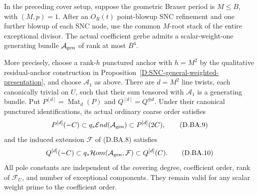 \begin{corollary}
\label{D:bounded-period-generating-root-anchor}
In the preceding cover setup, suppose the geometric Brauer
period is $M\le B$, with $(M,p)=1$. After an $O_R(t)$
point-blowup SNC refinement and one further blowup of each
SNC node, use the common $M$-root stack of the entire
exceptional divisor. The actual coefficient gerbe admits
a scalar-weight-one generating bundle $\mathcal A_{\rm gen}$
of rank at most $B^4$.

More precisely, choose a rank-$h$ punctured anchor with
$h=M^2$ by the qualitative residual-anchor construction
in Proposition~\ref{D:SNC-general-weighted-presentation},
and choose $\mathcal A_1$ as above. There are $d=M^2$
line twists, each canonically trivial on $U$, such that
their sum tensored with $\mathcal A_1$ is a generating
bundle. Put $P^{[d]}=\operatorname{Mat}_d(P)$ and
$Q^{[d]}=Q^{\oplus d}$. Under their canonical punctured
identifications, its actual ordinary coarse order satisfies
\[
 P^{[d]}(-C)\subset
 q_*\mathcal End(\mathcal A_{\rm gen})
                  \subset P^{[d]}(2C),                \tag{D.BA.9}
\]
and the induced extension $\mathcal F$ of (D.BA.8) satisfies
\[
 Q^{[d]}(-C)\subset
 q_*\mathcal Hom(\mathcal A_{\rm gen},\mathcal F)
                  \subset Q^{[d]}(C).                 \tag{D.BA.10}
\]
All pole constants are independent of the covering degree,
coefficient order, rank of $\mathcal F_U$, and number of
exceptional components. They remain valid for any scalar
weight prime to the coefficient order.
\end{corollary}

